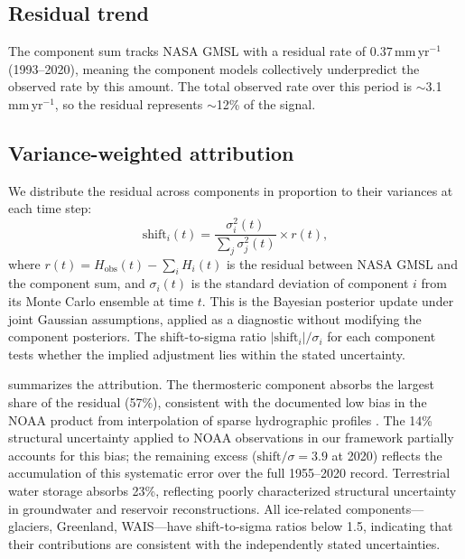 \documentclass[11pt]{article}
\begin{document}
\subsection{Residual trend}

The component sum tracks NASA GMSL with a residual rate of $0.37$\,mm\,yr$^{-1}$ (1993--2020), meaning the component models collectively underpredict the observed rate by this amount. The total observed rate over this period is $\sim$3.1\,mm\,yr$^{-1}$, so the residual represents $\sim$12\% of the signal.

\subsection{Variance-weighted attribution}

We distribute the residual across components in proportion to their variances at each time step:
\begin{equation}
	\mathrm{shift}_i(t) = \frac{\sigma_i^2(t)}{\sum_j \sigma_j^2(t)} \times r(t),
	\label{eq:budget_shift}
\end{equation}
where $r(t) = H_{\mathrm{obs}}(t) - \sum_i H_i(t)$ is the residual between NASA GMSL and the component sum, and $\sigma_i(t)$ is the standard deviation of component $i$ from its Monte Carlo ensemble at time $t$. This is the Bayesian posterior update under joint Gaussian assumptions, applied as a diagnostic without modifying the component posteriors. The shift-to-sigma ratio $|\mathrm{shift}_i| / \sigma_i$ for each component tests whether the implied adjustment lies within the stated uncertainty.

 summarizes the attribution. The thermosteric component absorbs the largest share of the residual (57\%), consistent with the documented low bias in the NOAA product from interpolation of sparse hydrographic profiles \citep{Li2022, Cheng2017}. The 14\% structural uncertainty applied to NOAA observations in our framework partially accounts for this bias; the remaining excess ($\mathrm{shift}/\sigma = 3.9$ at 2020) reflects the accumulation of this systematic error over the full 1955--2020 record. Terrestrial water storage absorbs 23\%, reflecting poorly characterized structural uncertainty in groundwater and reservoir reconstructions. All ice-related components---glaciers, Greenland, WAIS---have shift-to-sigma ratios below 1.5, indicating that their contributions are consistent with the independently stated uncertainties.
\end{document}

